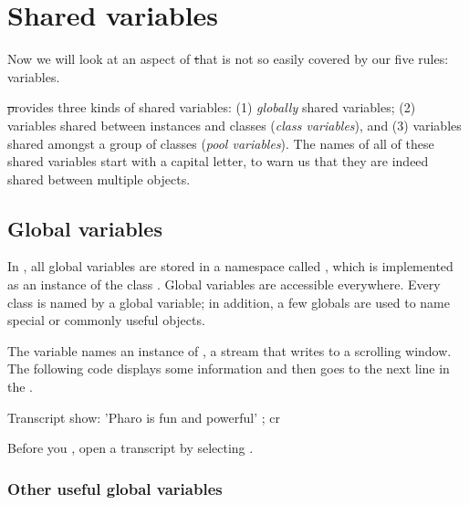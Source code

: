 \documentclass[a4paper,10pt,twoside]{book}
\begin{document}
\section{Shared variables}

Now we will look at an aspect of \st that is not so easily covered by our five rules:  variables.

\st provides three kinds of shared variables: (1) \emph{globally} shared variables; (2) variables shared between instances and classes (\emph{class variables}), and (3) variables shared amongst a group of  classes (\emph{pool variables}).  The names of all of these shared variables start with a capital letter, to warn us that they are indeed shared between multiple objects.

\subsection{Global variables}
In \pharo, all global variables are stored in a namespace called , which is implemented as an instance of the class .
Global variables are accessible everywhere. 
Every class is named by a global variable; in addition, a few globals are used to name special or commonly useful objects.

The variable  names an instance of , a stream that writes to a scrolling window.
The following code displays some information and then goes to the next line in the .

\begin{code}{}
Transcript show: 'Pharo is fun and powerful' ; cr
\end{code}

\noindent
Before you , open a transcript by selecting .


\subsubsection{Other useful global variables}
\end{document}
